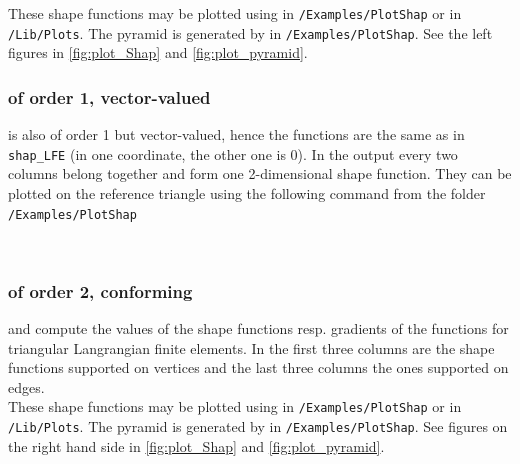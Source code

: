  These shape functions may be plotted using  in \linebreak
 {\tt /Examples/PlotShap} or  in {\tt /Lib/Plots}. The pyramid is generated by  in {\tt /Examples/PlotShap}. See the left figures in \ref{fig:plot_Shap} and \ref{fig:plot_pyramid}.


\subsubsection{of order 1, vector-valued}  

  is also of order 1 but vector-valued, hence the functions are the same as in {\tt shap\_LFE} (in one coordinate, the other one is $0$). In the output every two columns belong together and form one 2-dimensional shape function. They can be plotted on the reference triangle using the following command from the folder {\tt /Examples/PlotShap}

 \\



\subsubsection{of order 2, conforming} \label{sssect:shap_QFE} 

  and  compute the values of the shape functions resp. gradients of the functions for triangular Langrangian finite elements. In  the first three columns are the shape functions supported on vertices and the last three columns the ones supported on edges. \\

 These shape functions may be plotted using  in \linebreak
 {\tt /Examples/PlotShap} or  in {\tt /Lib/Plots}. The pyramid is generated by  in {\tt /Examples/PlotShap}. See figures on the right hand side in \ref{fig:plot_Shap} and \ref{fig:plot_pyramid}. \\

